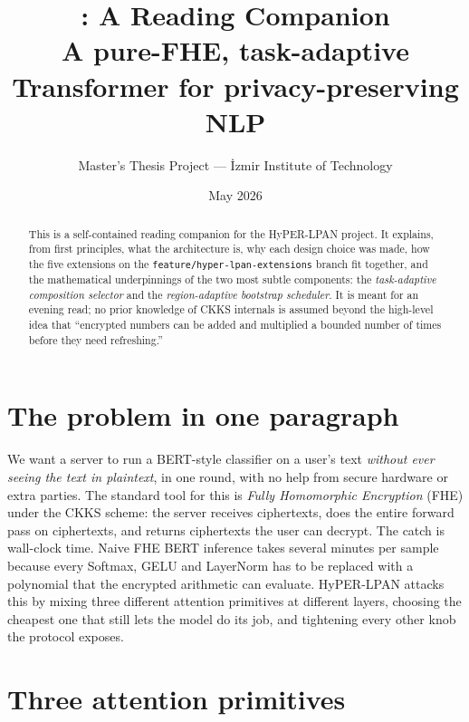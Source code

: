 \documentclass[11pt,a4paper]{article}
\title{\textbf{\hyperlpan: A Reading Companion}\\
       \large A pure-FHE, task-adaptive Transformer for privacy-preserving NLP}
\author{Master's Thesis Project — İzmir Institute of Technology}
\date{May 2026}
\newcommand{\hyperlpan}{HyPER-LPAN}
\begin{document}
\maketitle

\begin{abstract}
\noindent
This is a self-contained reading companion for the \hyperlpan{} project.
It explains, from first principles, what the architecture is, why each
design choice was made, how the five extensions on the
\texttt{feature/hyper-lpan-extensions} branch fit together, and the
mathematical underpinnings of the two most subtle components: the
\emph{task-adaptive composition selector} and the \emph{region-adaptive
bootstrap scheduler}. It is meant for an evening read; no prior
knowledge of CKKS internals is assumed beyond the high-level idea that
``encrypted numbers can be added and multiplied a bounded number of
times before they need refreshing.''
\end{abstract}

\tableofcontents
\vspace{0.3cm}

\section{The problem in one paragraph}

We want a server to run a BERT-style classifier on a user's text
\emph{without ever seeing the text in plaintext}, in one round, with
no help from secure hardware or extra parties. The standard tool for
this is \emph{Fully Homomorphic Encryption} (FHE) under the CKKS
scheme: the server receives ciphertexts, does the entire forward pass
on ciphertexts, and returns ciphertexts the user can decrypt. The
catch is wall-clock time. Naive FHE BERT inference takes several
minutes per sample because every Softmax, GELU and LayerNorm has to be
replaced with a polynomial that the encrypted arithmetic can evaluate.
\hyperlpan{} attacks this by mixing three different attention
primitives at different layers, choosing the cheapest one that still
lets the model do its job, and tightening every other knob the
protocol exposes.

\section{Three attention primitives}
\end{document}
